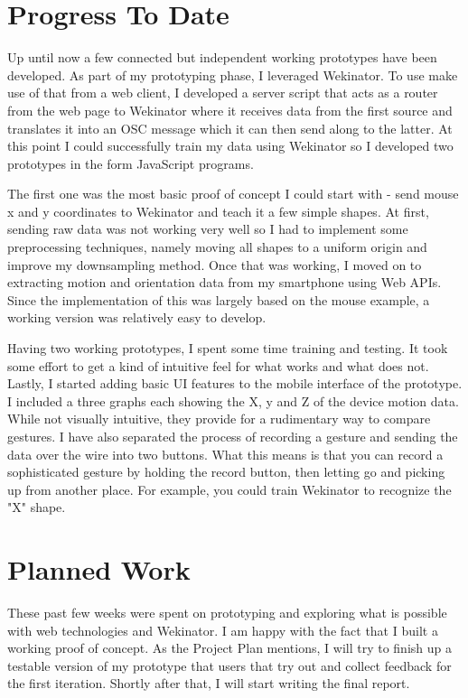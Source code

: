 \documentclass[a4paper, 11pt]{article}
\begin{document}
  \section{Progress To Date}
  Up until now a few connected but independent working prototypes have been developed. As part of my prototyping phase, I leveraged Wekinator. To use make use of that from a web client, I developed a server script that acts as a router from the web page to Wekinator where it receives data from the first source and translates it into an OSC message which it can then send along to the latter. At this point I could successfully train my data using Wekinator so I developed two prototypes in the form JavaScript programs.

  The first one was the most basic proof of concept I could start with - send mouse x and y coordinates to Wekinator and teach it a few simple shapes. At first, sending raw data was not working very well so I had to implement some preprocessing techniques, namely moving all shapes to a uniform origin and improve my downsampling method. Once that was working, I moved on to extracting motion and orientation data from my smartphone using Web APIs. Since the implementation of this was largely based on the mouse example, a working version was relatively easy to develop.

  Having two working prototypes, I spent some time training and testing. It took some effort to get a kind of intuitive feel for what works and what does not. Lastly, I started adding basic UI features to the mobile interface of the prototype. I included a three graphs each showing the X, y and Z of the device motion data. While not visually intuitive, they provide for a rudimentary way to compare gestures. I have also separated the process of recording a gesture and sending the data over the wire into two buttons. What this means is that you can record a sophisticated gesture by holding the record button, then letting go and picking up from another place. For example,  you could train Wekinator to recognize the "X" shape.

  \section{Planned Work}
  These past few weeks were spent on prototyping and exploring what is possible with web technologies and Wekinator. I am happy with the fact that I built a working proof of concept. As the Project Plan mentions, I will try to finish up a testable version of my prototype that users that try out and collect feedback for the first iteration. Shortly after that, I will start writing the final report.
\end{document}

